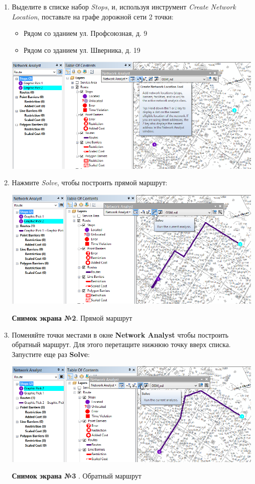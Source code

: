 \documentclass[]{book}
\providecommand{\tightlist}{%
  \setlength{\itemsep}{0pt}\setlength{\parskip}{0pt}}
\theoremstyle{definition}
\theoremstyle{definition}
\theoremstyle{definition}
\theoremstyle{remark}
\begin{document}
\begin{enumerate}
\def\labelenumi{\arabic{enumi}.}
\item
  Выделите в списке набор \emph{Stops}, и, используя инструмент
  \emph{Create Network Location}, поставьте на графе дорожной сети 2
  точки:

  \begin{itemize}
  \tightlist
  \item
    Рядом со зданием ул. Профсоюзная, д. 9
  \item
    Рядом со зданием ул. Шверника, д. 19
  \end{itemize}

  \includegraphics{images/Ex12/image10.png}
\item
  Нажмите \emph{Solve}, чтобы построить прямой маршрут:

  \includegraphics{images/Ex12/image11.png}

  \textbf{Снимок экрана №2}. Прямой маршрут
\item
  Поменяйте точки местами в окне \textbf{Network Analyst} чтобы
  построить обратный маршрут. Для этого перетащите нижнюю точку вверх
  списка. Запустите еще раз \textbf{Solve}:

  \includegraphics{images/Ex12/image12.png}

   \textbf{Снимок экрана №3} . Обратный маршрут
\end{enumerate}
\end{document}
